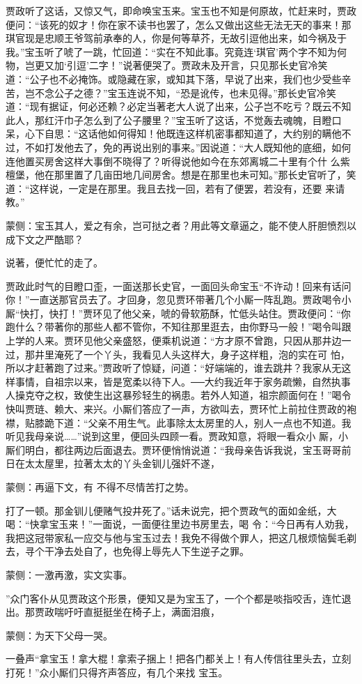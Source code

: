 \begin{parag}
    贾政听了这话，又惊又气，即命唤宝玉来。宝玉也不知是何原故，忙赶来时，贾政便问：“该死的奴才！你在家不读书也罢了，怎么又做出这些无法无天的事来！那琪官现是忠顺王爷驾前承奉的人，你是何等草芥，无故引逗他出来，如今祸及于我。”宝玉听了唬了一跳，忙回道：“实在不知此事。究竟连‘琪官’两个字不知为何物，岂更又加‘引逗’二字！”说著便哭了。贾政未及开言，只见那长史官冷笑道：“公子也不必掩饰。或隐藏在家，或知其下落，早说了出来，我们也少受些辛苦，岂不念公子之德？”宝玉连说不知，“恐是讹传，也未见得。”那长史官冷笑道：“现有据证，何必还赖？必定当著老大人说了出来，公子岂不吃亏？既云不知此人，那红汗巾子怎么到了公子腰里？”宝玉听了这话，不觉轰去魂魄，目瞪口呆，心下自思：“这话他如何得知！他既连这样机密事都知道了，大约别的瞒他不过，不如打发他去了，免的再说出别的事来。”因说道：“大人既知他的底细，如何连他置买房舍这样大事倒不晓得了？听得说他如今在东郊离城二十里有个什 么紫檀堡，他在那里置了几亩田地几间房舍。想是在那里也未可知。”那长史官听了，笑道：“这样说，一定是在那里。我且去找一回，若有了便罢，若没有，还要 来请教。”\begin{note}蒙侧：宝玉其人，爱之有余，岂可挞之者？用此等文章逼之，能不使人肝胆愤烈以成下文之严酷耶？\end{note}说著，便忙忙的走了。
\end{parag}


\begin{parag}
    贾政此时气的目瞪口歪，一面送那长史官，一面回头命宝玉“不许动！回来有话问你！”一直送那官员去了。才回身，忽见贾环带著几个小厮一阵乱跑。贾政喝令小厮“快打，快打！”贾环见了他父亲，唬的骨软筋酥，忙低头站住。贾政便问：“你跑什么？带著你的那些人都不管你，不知往那里逛去，由你野马一般！”喝令叫跟上学的人来。贾环见他父亲盛怒，便乘机说道：“方才原不曾跑，只因从那井边一过，那井里淹死了一个丫头，我看见人头这样大，身子这样粗，泡的实在可 怕，所以才赶著跑了过来。”贾政听了惊疑，问道：“好端端的，谁去跳井？我家从无这样事情，自祖宗以来，皆是宽柔以待下人。──大约我近年于家务疏懒，自然执事人操克夺之权，致使生出这暴殄轻生的祸患。若外人知道，祖宗颜面何在！”喝令快叫贾琏、赖大、来兴。小厮们答应了一声，方欲叫去，贾环忙上前拉住贾政的袍襟，贴膝跪下道：“父亲不用生气。此事除太太房里的人，别人一点也不知道。我听见我母亲说……”说到这里，便回头四顾一看。贾政知意，将眼一看众小 厮，小厮们明白，都往两边后面退去。贾环便悄悄说道：“我母亲告诉我说，宝玉哥哥前日在太太屋里，拉著太太的丫头金钏儿强奸不遂，\begin{note}蒙侧：再逼下文，有 不得不尽情苦打之势。\end{note}打了一顿。那金钏儿便赌气投井死了。”话未说完，把个贾政气的面如金纸，大喝：“快拿宝玉来！”一面说，一面便往里边书房里去，喝 令：“今日再有人劝我，我把这冠带家私一应交与他与宝玉过去！我免不得做个罪人，把这几根烦恼鬓毛剃去，寻个干净去处自了，也免得上辱先人下生逆子之罪。\begin{note}蒙侧：一激再激，实文实事。\end{note}”众门客仆从见贾政这个形景，便知又是为宝玉了，一个个都是啖指咬舌，连忙退出。那贾政喘吁吁直挺挺坐在椅子上，满面泪痕，\begin{note}蒙侧：为天下父母一哭。\end{note}一叠声“拿宝玉！拿大棍！拿索子捆上！把各门都关上！有人传信往里头去，立刻打死！”众小厮们只得齐声答应，有几个来找 宝玉。
\end{parag}


